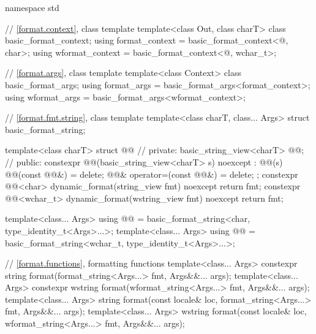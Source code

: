 %
%
%
%
%
%
%
%
%
%
\begin{codeblock}
namespace std {
  // \ref{format.context}, class template 
  template<class Out, class charT> class basic_format_context;
  using format_context = basic_format_context<@\unspec@, char>;
  using wformat_context = basic_format_context<@\unspec@, wchar_t>;

  // \ref{format.args}, class template 
  template<class Context> class basic_format_args;
  using format_args = basic_format_args<format_context>;
  using wformat_args = basic_format_args<wformat_context>;

  // \ref{format.fmt.string}, class template 
  template<class charT, class... Args>
    struct basic_format_string;

  template<class charT> struct @@ {                  // \expos
  private:
    basic_string_view<charT> @@;                                       // \expos
  public:
    constexpr @@(basic_string_view<charT> s) noexcept : @@(s) {}
    @@(const @@&) = delete;
    @@& operator=(const @@&) = delete;
  };
  constexpr @@<char>
    dynamic_format(string_view fmt) noexcept { return fmt; }
  constexpr @@<wchar_t>
    dynamic_format(wstring_view fmt) noexcept { return fmt; }

  template<class... Args>
    using @@ = basic_format_string<char, type_identity_t<Args>...>;
  template<class... Args>
    using @@ = basic_format_string<wchar_t, type_identity_t<Args>...>;

  // \ref{format.functions}, formatting functions
  template<class... Args>
    constexpr string format(format_string<Args...> fmt, Args&&... args);
  template<class... Args>
    constexpr wstring format(wformat_string<Args...> fmt, Args&&... args);
  template<class... Args>
    string format(const locale& loc, format_string<Args...> fmt, Args&&... args);
  template<class... Args>
    wstring format(const locale& loc, wformat_string<Args...> fmt, Args&&... args);

}
\end{codeblock}
